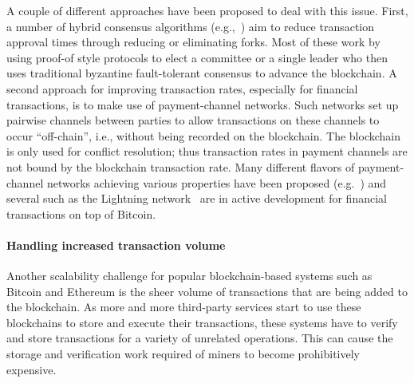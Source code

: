 A couple of different approaches have been proposed to deal with this issue.  First, a number of hybrid consensus algorithms (e.g.,~\cite{SOSP:GHMVZ17,OPODIS:AMNRS17,DISC:PasShi17,EC:PasShi18,NSDI:EGSR16}) aim to reduce transaction approval times through reducing or eliminating forks. Most of these work by using proof-of style protocols to elect a committee or a single leader who then uses traditional byzantine fault-tolerant consensus to advance the blockchain.  A second approach for improving transaction rates, especially for financial transactions, is to make use of payment-channel networks. Such networks set up pairwise channels between parties to allow transactions on these channels to occur ``off-chain'', i.e., without being recorded on the blockchain. The blockchain is only used for conflict resolution; thus transaction rates in payment channels are not bound by the blockchain transaction rate.  Many different flavors of payment-channel networks achieving various properties have been proposed (e.g.~\cite{PooDry16, NDSS:HABSG17,CCS:KhaGer17,SYSTOR:LNEKPS18,CCS:MMKMR17,CCS:GreMie17}) and several such as the Lightning network~\cite{PooDry16} are in active development for financial transactions on top of Bitcoin.  

\paragraph{Handling increased transaction volume}
Another scalability challenge for popular blockchain-based systems such as Bitcoin and Ethereum is the sheer volume of transactions that are being added to the blockchain.  As more and more third-party services start to use these blockchains to store and execute their transactions, these systems have to verify and store transactions for a variety of unrelated operations. This can cause the storage and verification work required of miners to become prohibitively expensive.

